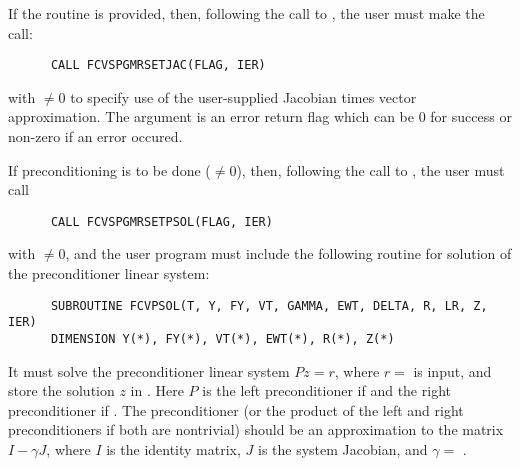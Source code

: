 \begin{Steps}
\begin{itemize}
    If the  routine is provided, then, 
    following the call to , the user must make the call:
\begin{verbatim}
      CALL FCVSPGMRSETJAC(FLAG, IER)
\end{verbatim}
    with $\neq 0$ to specify use of the user-supplied Jacobian times
    vector approximation.
    The argument  is an error return flag which can be $0$ 
    for success or non-zero if an error occured.

    If preconditioning is to be done ($\neq 0$), then, following the call 
    to , the user must call
\begin{verbatim}
      CALL FCVSPGMRSETPSOL(FLAG, IER)
\end{verbatim}
    with $\neq 0$, and the user program must include the following routine 
    for solution of the preconditioner linear system:
\begin{verbatim}
      SUBROUTINE FCVPSOL(T, Y, FY, VT, GAMMA, EWT, DELTA, R, LR, Z, IER)
      DIMENSION Y(*), FY(*), VT(*), EWT(*), R(*), Z(*)
\end{verbatim}
    It must solve the preconditioner linear system $Pz = r$, where $r =$  
    is input, and store the solution $z$ in . Here $P$ is the left 
    preconditioner if  and the right preconditioner if .  
    The preconditioner (or the product of the left and right preconditioners 
    if both are nontrivial) should be an  approximation to the matrix 
    $I - \gamma J$, where $I$ is the identity matrix, $J$ is the system Jacobian,
    and $\gamma =$ .
    

\end{itemize}
\end{Steps}
